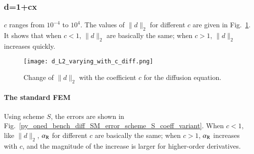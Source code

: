 \documentclass[review,3p]{elsarticle}
\begin{document}

\subsubsection{d=1+cx}

$c$ ranges from $10^{-4}$ to $10^4$. The values of $\|d\|_2$ for different $c$ are given in Fig.~\ref{Fig:d_L2_varying_with_c_diff}.
It shows that when $c<1$, $\|d\|_2$ are basically the same; when $c>1$, $\|d\|_2$ increases quickly.

\begin{figure}[!ht]
\centering
    \texttt{[image: d\_L2\_varying\_with\_c\_diff.png]}
    \caption{Change of $\|d\|_2$ with the coefficient $c$ for the diffusion equation.}
    \label{Fig:d_L2_varying_with_c_diff}   
\end{figure}

\paragraph{The standard FEM}

Using scheme $S$, the errors are shown in Fig.~\ref{py_oned_bench_diff_SM_error_scheme_S_coeff_variant}.
When $c<1$, like $\|d\|_2$, $\alpha_{\rm R}$ for different $c$ are basically the same; when $c>1$, $\alpha_{\rm R}$ increases with $c$, and the magnitude of the increase is larger for higher-order derivatives.
\end{document}
